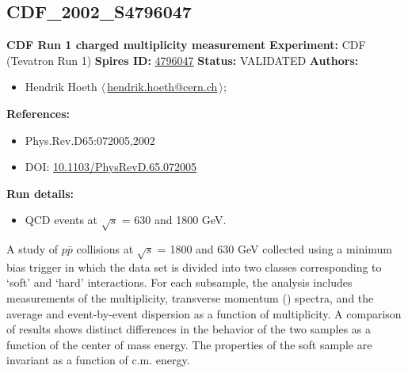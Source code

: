 \subsection[CDF\_2002\_S4796047]{CDF\_2002\_S4796047\,\cite{Acosta:2001rm}}
\textbf{CDF Run 1 charged multiplicity measurement}\newline
\textbf{Experiment:} CDF (Tevatron Run 1) \newline
\textbf{Spires ID:} \href{http://www.slac.stanford.edu/spires/find/hep/www?rawcmd=key+4796047}{4796047}\newline
\textbf{Status:} VALIDATED\newline
\textbf{Authors:}
\begin{itemize}
  \item Hendrik Hoeth $\langle\,$\href{mailto:hendrik.hoeth@cern.ch}{hendrik.hoeth@cern.ch}$\,\rangle$;
\end{itemize}
\textbf{References:}
\begin{itemize}
  \item Phys.Rev.D65:072005,2002
  \item DOI: \href{http://dx.doi.org/10.1103/PhysRevD.65.072005}{10.1103/PhysRevD.65.072005}
\end{itemize}
\textbf{Run details:}
\begin{itemize}

  \item QCD events at \ensuremath{\sqrt{s}} = 630 and 1800 GeV.\end{itemize}

\noindent A study of $p\bar{p}$ collisions at \ensuremath{\sqrt{s}} = 1800 and 630 GeV collected using a minimum bias trigger in which the data set is divided into two classes corresponding to `soft' and `hard' interactions. For each subsample, the analysis includes measurements of the multiplicity, transverse momentum (\pT) spectra, and the average \pT and event-by-event \pT dispersion as a function of multiplicity. A comparison of results shows distinct differences in the behavior of the two samples as a function of the center of mass energy. The properties of the soft sample are invariant as a function of c.m. energy.

\clearpage


\clearpage

